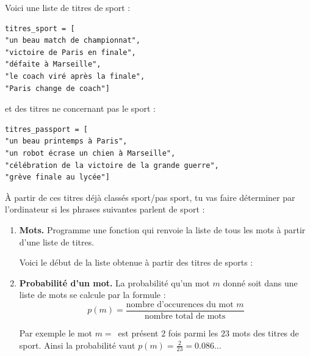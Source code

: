 \documentclass[11pt,class=report,crop=false]{standalone}
\begin{document}
\begin{activite}
	

Voici une liste de titres de sport :
\begin{center}
\begin{minipage}{0.7\textwidth}
\begin{lstlisting}
titres_sport = [
"un beau match de championnat",
"victoire de Paris en finale",
"défaite à Marseille",
"le coach viré après la finale",
"Paris change de coach"]
\end{lstlisting}
\end{minipage}	
\end{center}
et des titres ne concernant pas le sport :
\begin{center}
\begin{minipage}{0.7\textwidth}
\begin{lstlisting}
titres_passport = [
"un beau printemps à Paris",
"un robot écrase un chien à Marseille",
"célébration de la victoire de la grande guerre",
"grève finale au lycée"]
\end{lstlisting}
\end{minipage}	
\end{center}

\`A partir de ces titres déjà classés sport/pas sport, tu vas faire déterminer par l'ordinateur si les phrases suivantes parlent de sport :

\begin{enumerate}
	\item \textbf{Mots.}
	Programme une fonction  qui renvoie la liste de tous les mots à partir d'une liste de titres. 
	
	Voici le début de la liste obtenue à partir des titres de sports :	
	
	\item \textbf{Probabilité d'un mot.}
	La probabilité qu'un mot $m$ donné soit dans une liste de mots se calcule par la formule :
	$$p(m) = \frac{\text{nombre d'occurences du mot } m}{\text{nombre total de mots}}$$
	
	Par exemple le mot $m = \,$ est présent $2$ fois parmi les $23$ mots des titres de sport. Ainsi la probabilité vaut $p(m) = \frac{2}{23} = 0.086\ldots$
	

\end{enumerate}
\end{activite}
\end{document}
